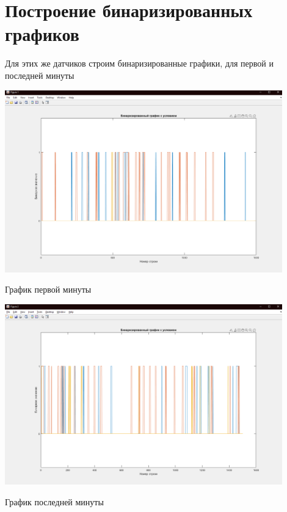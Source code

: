 \documentclass[a4paper,12pt]{article}
\begin{document}
\newpage
\section*{Построение бинаризированных графиков}
Для этих же датчиков строим бинаризированные графики, для первой и последней минуты
\begin{center}
\includegraphics[width=0.9\textwidth]{binary_first.png}
\end{center}
\begin{center}
График первой минуты
\end{center}
\begin{center}
\includegraphics[width=0.9\textwidth]{binary_last.png}
\end{center}
\begin{center}
График последней минуты 
\end{center}


\newpage
\end{document}
